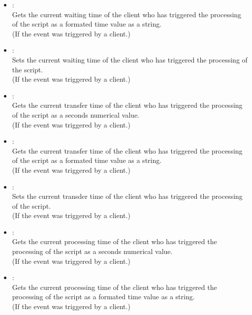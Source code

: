 \begin{itemize}
\item
{}:\\
Gets the current waiting time of the client who has triggered the processing of the script as a formated time value as a string.\\
(If the event was triggered by a client.)

\item
{}:\\
Sets the current waiting time of the client who has triggered the processing of the script.\\
(If the event was triggered by a client.)

\item
{}:\\
Gets the current transfer time of the client who has triggered the processing of the script as a seconds numerical value.\\
(If the event was triggered by a client.)

\item
{}:\\
Gets the current transfer time of the client who has triggered the processing of the script as a formated time value as a string.\\
(If the event was triggered by a client.)

\item
{}:\\
Sets the current transder time of the client who has triggered the processing of the script.\\
(If the event was triggered by a client.)

\item
{}:\\
Gets the current processing time of the client who has triggered the processing of the script as a seconds numerical value.\\
(If the event was triggered by a client.)

\item
{}:\\
Gets the current processing time of the client who has triggered the processing of the script as a formated time value as a string.\\
(If the event was triggered by a client.)


\end{itemize}
